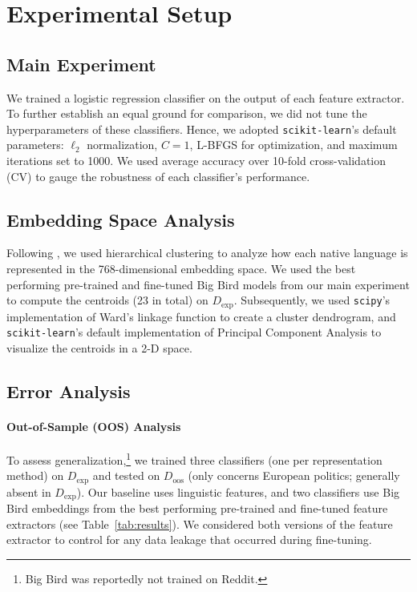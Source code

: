 \documentclass[10pt, a4paper]{article}
\begin{document}
\section{Experimental Setup} \label{sec:experiment-design}

\subsection{Main Experiment} \label{sec:classifiers}
We trained a logistic regression classifier on the output of each feature extractor. To further establish an equal ground for comparison, we did not tune the hyperparameters of these classifiers. Hence, we adopted \texttt{scikit-learn}'s default parameters: $\ell_2$ normalization, $C = 1$, L-BFGS \cite{DBLP:journals/mp/LiuN89} for optimization, and maximum  iterations set to 1000. We used average accuracy over 10-fold cross-validation (CV) to gauge the robustness of each classifier's performance. 


\subsection{Embedding Space Analysis} \label{sec:method-embeddings-space-analysis}

Following , we used hierarchical clustering to analyze how each native language is represented in the 768-dimensional embedding space. We used the best performing pre-trained and fine-tuned Big Bird models from our main experiment to compute the centroids (23 in total) on $D_\text{exp}$. Subsequently, we used \texttt{scipy}'s \cite{2020SciPy-NMeth} implementation of Ward's linkage function \cite{doi:10.1080/01621459.1963.10500845} to create a cluster dendrogram, and \texttt{scikit-learn}'s default implementation of Principal Component Analysis \cite[PCA]{ca8f88b9-5b15-3338-a57a-9a4e79049bef,10.1111/1467-9868.00196} to visualize the centroids in a 2-D space.


\subsection{Error Analysis}

\paragraph{Out-of-Sample (OOS) Analysis} \label{sec:out-of-sample}
To assess generalization,\footnote{Big Bird was reportedly not trained on Reddit.} we trained three classifiers (one per representation method) on $D_\text{exp}$ and tested on $D_\text{oos}$ (only concerns European politics; generally absent in $D_\text{exp}$). Our baseline uses linguistic features, and two classifiers use Big Bird embeddings from the best performing pre-trained and fine-tuned feature extractors (see Table~\ref{tab:results}). We considered both versions of the feature extractor to control for any data leakage that occurred during fine-tuning.
\end{document}
